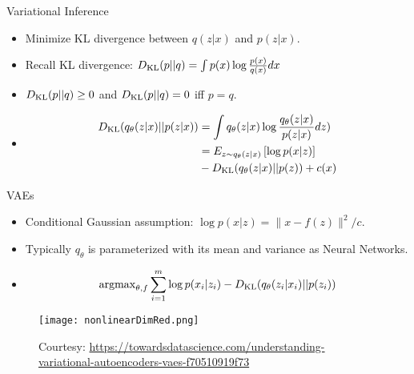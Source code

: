 \documentclass[final]{beamer}
\begin{document}
\begin{frame}{Variational Inference}
	\begin{itemize}
		\item Minimize KL divergence between $q(z|x)$ and $p(z|x)$.
		\item Recall KL divergence: $D_{\rm KL}(p||q) = \int p(x) \log \frac{p(x)}{q(x)} dx$ 
		\pause
		\item $D_{\rm KL}(p||q) \geq 0$ and $D_{\rm KL}(p||q) = 0$ iff $p = q$. 
		\pause
		\item 
		\begin{align*}
		D_{\rm KL}(q_\theta(z|x)||p(z|x)) &= \int q_\theta(z|x) \log \frac{q_\theta(z|x)}{p(z|x)} dz) \\
			&= E_{z \sim q_\theta(z|x)} \left[\log p(x|z)\right] \\ &- D_{\rm KL}(q_\theta(z|x)||p(z)) + c(x) \\
		\end{align*}
	\end{itemize}
	
\end{frame}
\begin{frame}{VAEs}
	\begin{itemize}
		\item Conditional Gaussian assumption: $\log p(x|z) = \|x-f(z)\|^2/c.$
		\pause 
		\item Typically $q_\theta$ is parameterized with its mean and variance as Neural Networks.
		\pause
		\item \begin{align}
			{\rm arg max}_{\theta, f} \sum_{i=1}^m \log p(x_i|z_i) - D_{\rm KL}(q_\theta(z_i|x_i)||p(z_i))
			\end{align}
			
	\end{itemize}
\end{frame}
\begin{frame}
\begin{figure}
	\texttt{[image: nonlinearDimRed.png]}
	\caption{Courtesy: \url{https://towardsdatascience.com/understanding-variational-autoencoders-vaes-f70510919f73}}
\end{figure}
\end{frame}
\end{document}
